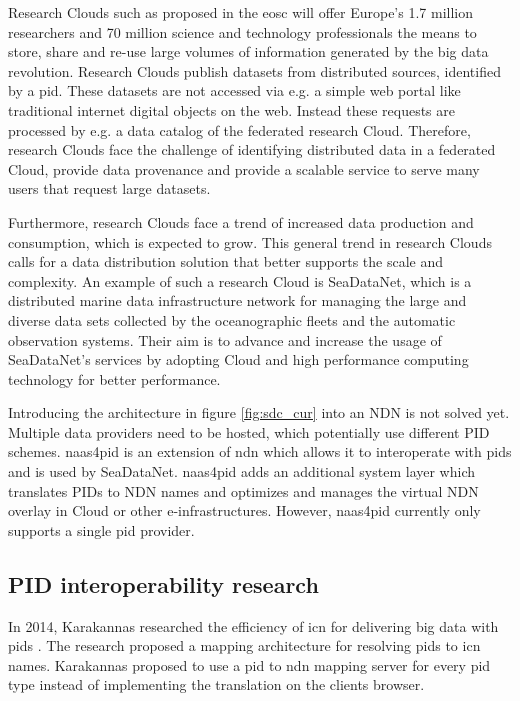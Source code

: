 \documentclass[conference]{IEEEtran}
\begin{document}
Research Clouds such as proposed in the \gls{eosc} will offer Europe's 1.7 million researchers and 70 million science and technology professionals the means to store, share and re-use large volumes of information generated by the big data revolution. Research Clouds publish datasets from distributed sources, identified by a \gls{pid}. These datasets are not accessed via e.g. a simple web portal like traditional internet digital objects on the web. Instead these requests are processed by e.g. a data catalog of the federated research Cloud. Therefore, research Clouds face the challenge of identifying distributed data in a federated Cloud, provide data provenance and provide a scalable service to serve many users that request large datasets.

Furthermore, research Clouds face a trend of increased data production and consumption, which is expected to grow. This general trend in research Clouds calls for a data distribution solution that better supports the scale and complexity. An example of such a research Cloud is SeaDataNet, which is a distributed marine data infrastructure network for managing the large and diverse data sets collected by the oceanographic fleets and the automatic observation systems. Their aim is to advance and increase the usage of SeaDataNet's services by adopting Cloud and high performance computing technology for better performance.


Introducing the architecture in figure \ref{fig:sdc_cur} into an NDN is not solved yet. Multiple data providers need to be hosted, which potentially use different PID schemes. \gls{naas4pid} is an extension of \gls{ndn} which allows it to interoperate with \glspl{pid} and is used by SeaDataNet. \gls{naas4pid} adds an additional system layer which translates PIDs to NDN names and optimizes and manages the virtual NDN overlay in Cloud or other e-infrastructures. However, \gls{naas4pid} currently only supports a single \gls{pid} provider.
\subsection{PID interoperability research}
In 2014, Karakannas researched the efficiency of \gls{icn} for delivering big data with \glspl{pid} \cite{icn-bd}. The research proposed a mapping architecture for resolving \glspl{pid} to \gls{icn} names. Karakannas proposed to use a \gls{pid} to \gls{ndn} mapping server for every \gls{pid} type instead of implementing the translation on the clients browser.
\end{document}

